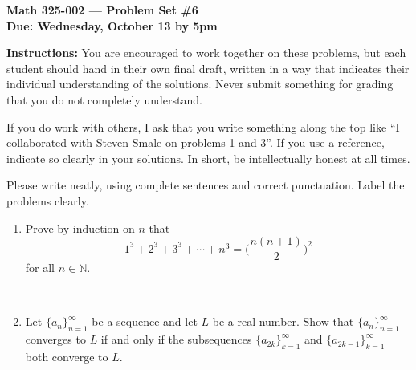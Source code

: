 \documentclass{amsart}
\begin{document}
\begin{center}
{\large\bfseries
Math 325-002 --- Problem Set \#6 \\
Due: Wednesday, October 13 by 5pm}
\end{center}





{\bf Instructions:} You are encouraged to work together on these
problems, but each student should hand in their own final draft,
written in a way that indicates their individual understanding of
the solutions. Never submit something for grading
that you do not completely understand. 

If you do work with others, I ask that you write something along the
top like ``I collaborated with Steven Smale on problems 1 and 3''.
If you use a reference, indicate so clearly in your solutions. 
In short, be intellectually
honest at all times.

Please write neatly, using complete sentences and correct
punctuation. Label the problems clearly. 






\begin{enumerate}
	
	\item Prove by induction on $n$ that 
	\[ 1^3 + 2^3 + 3^3 + \cdots + n^3 = \Big(\frac{n(n+1)}{2}\Big)^2 \]
	for all $n \in \mathbb N$. 
	
	\ 
	
	\item Let $\{a_n\}_{n=1}^\infty$ be a sequence and let $L$ be a real number.  Show that $\{a_n\}_{n=1}^\infty$ converges to $L$ if and only if the subsequences $\{a_{2k}\}_{k=1}^\infty$ and $\{a_{2k-1}\}_{k=1}^\infty$ both converge to $L$.
		
	\end{enumerate}
	
	
\end{document}
